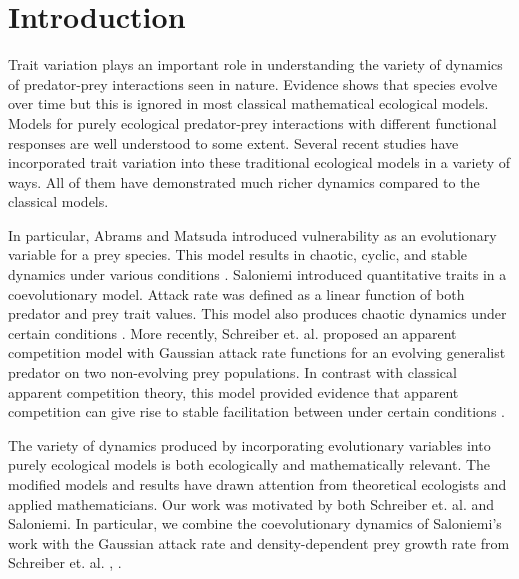 \documentclass{amsart}
\theoremstyle{definition}
\theoremstyle{remark}
\numberwithin{equation}{section}
\begin{document}
\maketitle





























\section{Introduction}

Trait variation plays an important role in understanding the variety of dynamics of predator-prey interactions seen in nature.  Evidence shows that species evolve over time but this is ignored in most classical mathematical ecological models.  Models for purely ecological predator-prey interactions with different functional responses are well understood to some extent.  Several recent studies have incorporated trait variation into these traditional ecological models in a variety of ways.  All of them have demonstrated much richer dynamics compared to the classical models.

In particular, Abrams and Matsuda introduced vulnerability as an evolutionary variable for a prey species.  This model results in chaotic, cyclic, and stable dynamics under various conditions \cite{Abrams_Matsuda_1997}.  Saloniemi introduced quantitative traits in a coevolutionary model.  Attack rate was defined as a linear function of both predator and prey trait values.  This model also produces chaotic dynamics under certain conditions \cite{Saloniemi_1993}.  More recently, Schreiber et. al. proposed an apparent competition model with Gaussian attack rate functions for an evolving generalist predator on two non-evolving prey populations.  In contrast with classical apparent competition theory, this model provided evidence that apparent competition can give rise to stable facilitation between under certain conditions \cite{Schreiber_2011}.

The variety of dynamics produced by incorporating evolutionary variables into purely ecological models is both ecologically and mathematically relevant.  The modified models and results have drawn attention from theoretical ecologists and applied mathematicians.  Our work was motivated by both Schreiber et. al. and Saloniemi.  In particular, we combine the coevolutionary dynamics of Saloniemi's work with the Gaussian attack rate and density-dependent prey growth rate from Schreiber et. al. \cite{Schreiber_2011}, \cite{Saloniemi_1993}.
\end{document}
